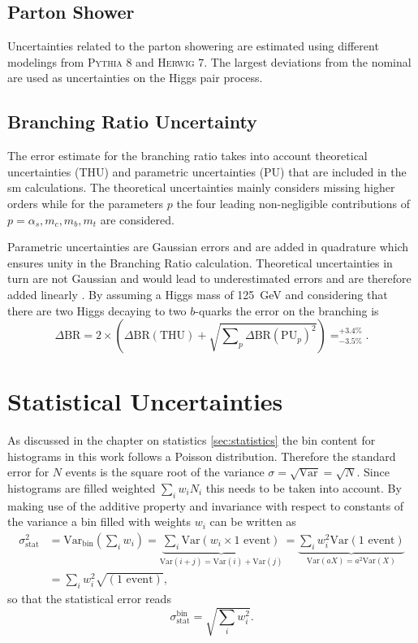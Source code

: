 \subsection{Parton Shower}
Uncertainties related to the parton showering are estimated using different modelings from \textsc{Pythia 8} and \textsc{Herwig 7}. The largest deviations from the nominal are used as uncertainties on the Higgs pair process. 


\subsection{Branching Ratio Uncertainty}
The error estimate for the branching ratio takes into account theoretical uncertainties (THU) and parametric uncertainties (PU) that are included in the \ac{sm} calculations. The theoretical uncertainties mainly considers missing higher orders while for the parameters $p$ the four leading non-negligible contributions of $p=\alpha_s,m_c,m_b,m_t$ are considered.

Parametric uncertainties are Gaussian errors and are added in quadrature which ensures unity in the Branching Ratio calculation. Theoretical uncertainties in turn are not Gaussian and would lead to underestimated errors and are therefore added linearly \citep{de2016arxiv}. By assuming a Higgs mass of \qty[]{125}{GeV} and considering that there are two Higgs decaying to two $b$-quarks the error on the branching is
\begin{equation}
    \Delta\text{BR} = 2 \times \left(\Delta\text{BR}(\text{THU}) + \sqrt{\sum\nolimits_{p} \Delta\text{BR}(\text{PU}_{p})^2 }\right) = _{-3.5\%}^{+3.4\%}.
\end{equation}

\section{Statistical Uncertainties}
As discussed in the chapter on statistics \ref{sec:statistics} the bin content for histograms in this work follows a Poisson distribution. Therefore the standard error for $N$ events is the square root of the variance $\sigma=\sqrt{\text{Var}}=\sqrt{N}$. Since histograms are filled weighted $\sum_i w_i N_i$ this needs to be taken into account. By making use of the additive property and invariance with respect to constants of the variance a bin filled with weights $w_i$ can be written as
\begin{align}
    \sigma_\text{stat}^2 & = \text{Var}_\text{bin}\left(\sum_i w_i\right)
    =
    \underbrace{\sum_i \text{Var}(w_i \times 1\text{ event})}_{\text{Var}(i+j)=\text{Var}(i)+\text{Var}(j)}
    =
    \underbrace{\sum_i w_i^2\text{Var}(1\text{ event})}_{\text{Var}(aX)=a^2\text{Var}(X)} \\ \nonumber
                         & =\sum_i w_i^2\sqrt{(1\text{ event})},
\end{align}
so that the statistical error reads
\begin{equation}
    \sigma_\text{stat}^\text{bin}=\sqrt{\sum_i w_i^2}.
\end{equation}

